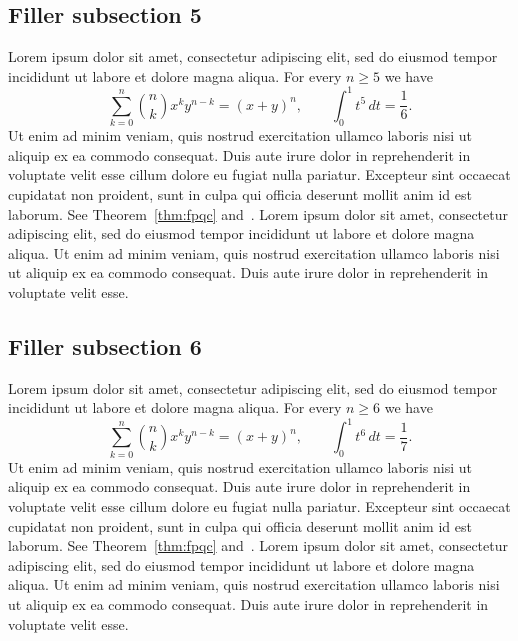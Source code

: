 \documentclass[11pt]{amsart}
\theoremstyle{definition}
\theoremstyle{remark}
\begin{document}
\subsection{Filler subsection 5}
Lorem ipsum dolor sit amet, consectetur adipiscing elit, sed do eiusmod
tempor incididunt ut labore et dolore magna aliqua. For every $n\ge 5$ we have
\[
\sum_{k=0}^{n}\binom{n}{k}x^k y^{n-k}=(x+y)^n,\qquad
\int_0^1 t^{5}\,dt=\frac{1}{6}.
\]
Ut enim ad minim veniam, quis nostrud exercitation ullamco laboris nisi ut
aliquip ex ea commodo consequat. Duis aute irure dolor in reprehenderit in
voluptate velit esse cillum dolore eu fugiat nulla pariatur. Excepteur sint
occaecat cupidatat non proident, sunt in culpa qui officia deserunt mollit
anim id est laborum. See Theorem~\ref{thm:fpqc} and~\cite{Vistoli}.
Lorem ipsum dolor sit amet, consectetur adipiscing elit, sed do eiusmod
tempor incididunt ut labore et dolore magna aliqua. Ut enim ad minim veniam,
quis nostrud exercitation ullamco laboris nisi ut aliquip ex ea commodo
consequat. Duis aute irure dolor in reprehenderit in voluptate velit esse.

\subsection{Filler subsection 6}
Lorem ipsum dolor sit amet, consectetur adipiscing elit, sed do eiusmod
tempor incididunt ut labore et dolore magna aliqua. For every $n\ge 6$ we have
\[
\sum_{k=0}^{n}\binom{n}{k}x^k y^{n-k}=(x+y)^n,\qquad
\int_0^1 t^{6}\,dt=\frac{1}{7}.
\]
Ut enim ad minim veniam, quis nostrud exercitation ullamco laboris nisi ut
aliquip ex ea commodo consequat. Duis aute irure dolor in reprehenderit in
voluptate velit esse cillum dolore eu fugiat nulla pariatur. Excepteur sint
occaecat cupidatat non proident, sunt in culpa qui officia deserunt mollit
anim id est laborum. See Theorem~\ref{thm:fpqc} and~\cite{Vistoli}.
Lorem ipsum dolor sit amet, consectetur adipiscing elit, sed do eiusmod
tempor incididunt ut labore et dolore magna aliqua. Ut enim ad minim veniam,
quis nostrud exercitation ullamco laboris nisi ut aliquip ex ea commodo
consequat. Duis aute irure dolor in reprehenderit in voluptate velit esse.

\printbibliography
\end{document}
